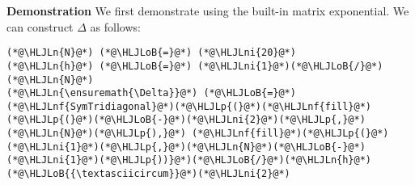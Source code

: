\documentclass[12pt,landscape]{article}
\newcommand{\HLJLn}[1]{#1}
\newcommand{\HLJLnf}[1]{\textcolor[RGB]{66,102,213}{#1}}
\newcommand{\HLJLni}[1]{\textcolor[RGB]{59,151,46}{#1}}
\newcommand{\HLJLoB}[1]{\textcolor[RGB]{102,102,102}{\textbf{#1}}}
\newcommand{\HLJLp}[1]{#1}
\begin{document}
{\textbf{Demonstration} We first demonstrate using the built-in matrix exponential. We can construct $\Delta$ as follows:


\begin{lstlisting}
(*@\HLJLn{N}@*) (*@\HLJLoB{=}@*) (*@\HLJLni{20}@*)
(*@\HLJLn{h}@*) (*@\HLJLoB{=}@*) (*@\HLJLni{1}@*)(*@\HLJLoB{/}@*)(*@\HLJLn{N}@*)
(*@\HLJLn{\ensuremath{\Delta}}@*) (*@\HLJLoB{=}@*) (*@\HLJLnf{SymTridiagonal}@*)(*@\HLJLp{(}@*)(*@\HLJLnf{fill}@*)(*@\HLJLp{(}@*)(*@\HLJLoB{-}@*)(*@\HLJLni{2}@*)(*@\HLJLp{,}@*)(*@\HLJLn{N}@*)(*@\HLJLp{),}@*) (*@\HLJLnf{fill}@*)(*@\HLJLp{(}@*)(*@\HLJLni{1}@*)(*@\HLJLp{,}@*)(*@\HLJLn{N}@*)(*@\HLJLoB{-}@*)(*@\HLJLni{1}@*)(*@\HLJLp{))}@*)(*@\HLJLoB{/}@*)(*@\HLJLn{h}@*)(*@\HLJLoB{{\textasciicircum}}@*)(*@\HLJLni{2}@*)
\end{lstlisting}

}
\end{document}
